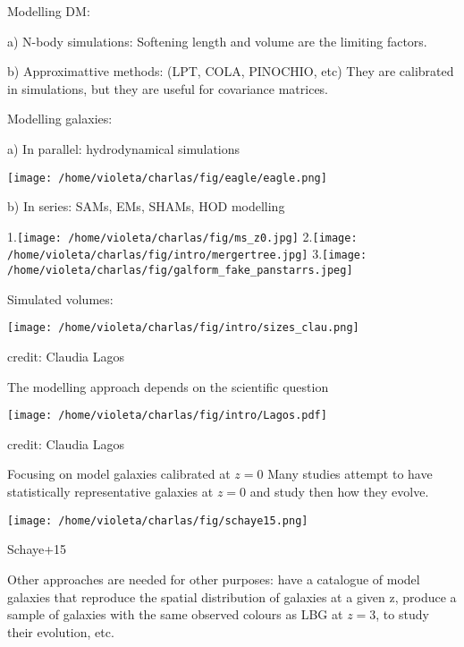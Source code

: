 \documentclass{beamer}
\begin{document}
\begin{frame}{Modelling DM:}

{\color{blue} a) N-body simulations:} Softening length and volume are the limiting factors.

{\color{blue} b) Approximattive methods:} (LPT, COLA, PINOCHIO, etc) They are calibrated in simulations, but they are useful for covariance matrices.
\end{frame}


\begin{frame}{Modelling galaxies:}

{\color{blue} a) In parallel:}  hydrodynamical simulations
\begin{center}
   \texttt{[image: /home/violeta/charlas/fig/eagle/eagle.png]}
\end{center}
{\color{blue} b) In series:}  SAMs, EMs, SHAMs, HOD modelling

   1.\texttt{[image: /home/violeta/charlas/fig/ms\_z0.jpg]}{ } 
    2.\texttt{[image: /home/violeta/charlas/fig/intro/mergertree.jpg]}{ }
    3.\texttt{[image: /home/violeta/charlas/fig/galform\_fake\_panstarrs.jpeg]}
\end{frame}

\begin{frame}{Simulated volumes:}
\begin{center}
\texttt{[image: /home/violeta/charlas/fig/intro/sizes\_clau.png]}

{\tiny {\sc credit:} Claudia Lagos}
\end{center}
\end{frame}


\begin{frame}{The modelling approach depends on the scientific question}
\begin{center}
\texttt{[image: /home/violeta/charlas/fig/intro/Lagos.pdf]}

{\tiny {\sc credit:} Claudia Lagos}
\end{center}
\end{frame}


\begin{frame}{Focusing on model galaxies calibrated at $z=0$}
Many studies attempt to have statistically representative galaxies at $z=0$ and study then how they evolve. 
\begin{center}
\texttt{[image: /home/violeta/charlas/fig/schaye15.png]}

{\tiny \color{orange} Schaye+15}
\end{center}

Other approaches are needed for other purposes: {\tiny have a catalogue of model galaxies that reproduce the spatial distribution of galaxies at a given z, produce a sample of galaxies with the same observed colours as LBG at $z=3$, to study their evolution, etc.}
\end{frame}
\end{document}
